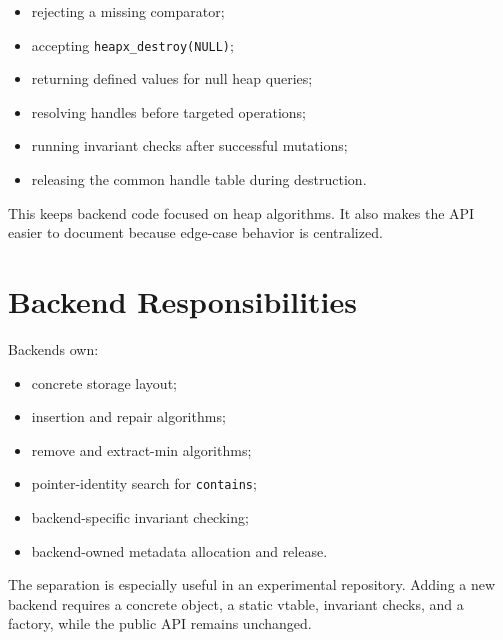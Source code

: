 \begin{itemize}
    \item rejecting a missing comparator;
    \item accepting \texttt{heapx\_destroy(NULL)};
    \item returning defined values for null heap queries;
    \item resolving handles before targeted operations;
    \item running invariant checks after successful mutations;
    \item releasing the common handle table during destruction.
\end{itemize}

This keeps backend code focused on heap algorithms.
It also makes the API easier to document because edge-case behavior is centralized.

\section{Backend Responsibilities}

Backends own:

\begin{itemize}
    \item concrete storage layout;
    \item insertion and repair algorithms;
    \item remove and extract-min algorithms;
    \item pointer-identity search for \texttt{contains};
    \item backend-specific invariant checking;
    \item backend-owned metadata allocation and release.
\end{itemize}

The separation is especially useful in an experimental repository.
Adding a new backend requires a concrete object, a static vtable, invariant checks, and a factory, while the public API remains unchanged.
